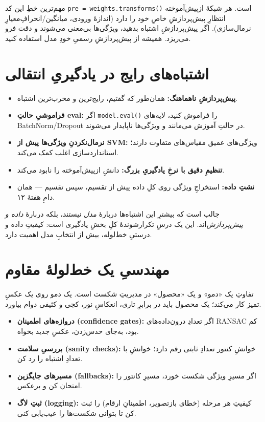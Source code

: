\documentclass[12pt,a4paper]{article}
\begin{document}
\begin{hoshdar}
مهم‌ترین خطِ این کد \texttt{pre = weights.transforms()} است. هر شبکهٔ از‌پیش‌آموخته انتظارِ پیش‌پردازشِ خاصِ خود را دارد (اندازهٔ ورودی، میانگین/انحرافِ‌معیارِ نرمال‌سازی). اگر پیش‌پردازشِ اشتباه بدهید، ویژگی‌ها بی‌معنی می‌شوند و دقت فرو می‌ریزد. همیشه از پیش‌پردازشِ رسمیِ خودِ مدل استفاده کنید.
\end{hoshdar}

\section{اشتباه‌های رایج در یادگیریِ انتقالی}

\begin{itemize}
  \item \textbf{پیش‌پردازشِ ناهماهنگ:} همان‌طور که گفتیم، رایج‌ترین و مخرب‌ترین اشتباه.
  \item \textbf{فراموشیِ حالتِ eval:} اگر \texttt{model.eval()} را فراموش کنید، لایه‌های BatchNorm/Dropout در حالتِ آموزش می‌مانند و ویژگی‌ها ناپایدار می‌شوند.
  \item \textbf{نرمال‌نکردنِ ویژگی‌ها پیش از SVM:} ویژگی‌های عمیق مقیاس‌های متفاوت دارند؛ استانداردسازی اغلب کمک می‌کند.
  \item \textbf{تنظیمِ دقیق با نرخِ یادگیریِ بزرگ:} دانشِ از‌پیش‌آموخته را نابود می‌کند.
  \item \textbf{نشتِ داده:} استخراجِ ویژگی روی کلِ داده پیش از تقسیم، سپس تقسیم — همان دامِ هفتهٔ ۱۲.
\end{itemize}

\begin{nokte}
جالب است که بیشترِ این اشتباه‌ها دربارهٔ \emph{مدل} نیستند، بلکه دربارهٔ \emph{داده و پیش‌پردازش}‌اند. این یک درسِ تکرارشوندهٔ کلِ بخشِ یادگیری است: کیفیتِ داده و درستیِ خط‌لوله، بیش از انتخابِ مدل اهمیت دارد.
\end{nokte}

\section{مهندسیِ یک خط‌لولهٔ مقاوم}

تفاوتِ یک «دمو» و یک «محصول» در مدیریتِ شکست است. یک دمو روی یک عکسِ تمیز کار می‌کند؛ یک محصول باید در برابرِ تاری، انعکاسِ نور، کجی و کثیفی دوام بیاورد.

\begin{itemize}
  \item \textbf{دروازه‌های اطمینان (confidence gates):} اگر تعدادِ درون‌داده‌های RANSAC کم بود، به‌جای حدس‌زدن، عکسِ جدید بخواه.
  \item \textbf{بررسیِ سلامت (sanity checks):} خوانشِ کنتور تعدادِ ثابتی رقم دارد؛ خوانشِ با تعدادِ اشتباه را رد کن.
  \item \textbf{مسیرهای جایگزین (fallbacks):} اگر مسیرِ ویژگی شکست خورد، مسیرِ کانتور را امتحان کن و برعکس.
  \item \textbf{ثبتِ لاگ (logging):} کیفیتِ هر مرحله (خطای بازتصویر، اطمینانِ ارقام) را ثبت کن تا بتوانی شکست‌ها را عیب‌یابی کنی.
\end{itemize}
\end{document}
